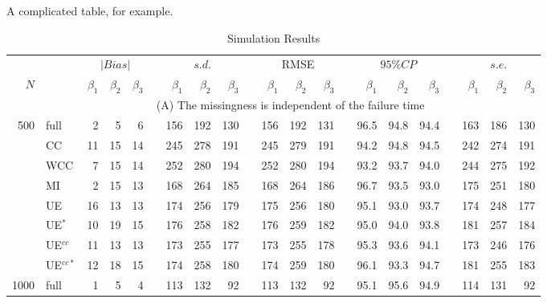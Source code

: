 \documentclass[
  12pt,
  openany, oneside]{book}
\theoremstyle{definition}
\theoremstyle{definition}
\theoremstyle{definition}
\theoremstyle{definition}
\theoremstyle{remark}
\begin{document}
A complicated table, for example.

\begin{table}
\caption{\label{tab:t1a} Simulation Results} 
\centering
 \def\~{\hphantom{0}}
\setlength{\tabcolsep}{2.8pt}
\renewcommand{\arraystretch}{.95}
\begin{tabular}{rlrrrrrrrrrrrrrrrrrrr}
\hline\noalign{\smallskip}
 && \multicolumn{3}{c}{$|Bias|$} && \multicolumn{3}{c}{$s.d.$} && \multicolumn{3}{c}{RMSE} && \multicolumn{3}{c}{$95\% CP$}&& \multicolumn{3}{c}{$s.e.$}\\
 \cline{3-5} \cline{7-9} \cline{11-13} \cline{15-17} \cline{19-21}
$N$&& $\beta_1$ & $\beta_2$ & $\beta_3$ &&  $\beta_1$ & $\beta_2$ & $\beta_3$ &&  $\beta_1$ & $\beta_2$ & $\beta_3$ &&  $\beta_1$ & $\beta_2$  & $\beta_3$ && $\beta_1$ & $\beta_2$  & $\beta_3$\\
\hline\noalign{\smallskip}
& \multicolumn{20}{c}{(A) The missingness is independent of the failure time}\\
\noalign{\smallskip}
500
& full    & 2  &  5 &   6 &&    156  & 192 &  130 &&  156 &   192 &   131  &&  96.5  & 94.8 &  94.4 &&  163 &   186  & 130 \\
& CC     & 11  & 15 & 14 &&    245  & 278 &  191 &&  245 &   279 &   191   && 94.2  & 94.8 &  94.5  && 242 &  274  & 191 \\
& WCC  & 7  &  15 & 14 &&    252 &  280 &  194 &&  252 &   280  &  194   && 93.2  & 93.7  & 94.0 &&    244 &  275 &  192 \\
& MI     & 2  &   15 & 13 &&    168 &  264 &  185 &&  168 &   264  &  186   && 96.7  & 93.5  & 93.0 &&     175 &  251 &  180 \\
& UE    & 16  &   13 &  13 &&    174 &  256 &  179 &&  175 &   256 &   180   && 95.1  & 93.0  &   93.7 &&  174 &  248  & 177 \\
& UE$^*$  & 10 &  19 &  15 &&    176 &  258 &  182 &&  176 &   259  &  182   && 95.0    & 94.0 &    93.8 &&  181 &  257 &  184 \\
& UE$^{cc}$  & 11 & 13 & 13 &&    173 &  255 &  177 &&  173 &   255  &  178   && 95.3  & 93.6  & 94.1 &&  173 &  246 &  176 \\
& UE$^{cc*}$  & 12 & 18 & 15 &&    174 &  258 &  180 &&  174 &   259 &   180  &&  96.1 &  93.3 &  94.7 &&  181 &  255 &  183 \\
\noalign{\smallskip}
1000
& full     & 1 & 5 &    4 &&    113 &  132 &  92  &&  113  &  132  &  92   &&  95.1 &  95.6  & 94.9 &&  114  & 131 &  92  \\

\end{tabular}
\end{table}
\end{document}
